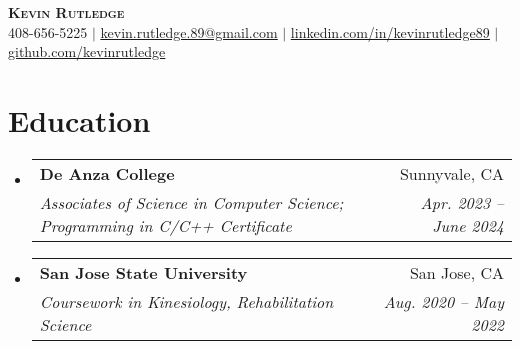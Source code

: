 \documentclass[letterpaper,11pt]{article}
\makeatletter
\newcommand{\resumeSubheading}[4]{
    \vspace{-2pt}\item
    \begin{tabular*}{0.97\textwidth}[t]{l@{\extracolsep{\fill}}r}
        \textbf{#1} & #2 \\
        \textit{\small#3} & \textit{\small #4} \\
    \end{tabular*}\vspace{-7pt}
}
\newenvironment{resumeSubHeadingList}{\begin{itemize}[leftmargin=0.15in, label={}]}{\end{itemize}}
\makeatother
\begin{document}
    \begin{center}
        \textbf{\Huge \scshape Kevin Rutledge} \\ \vspace{3pt}
        \small 408-656-5225 $|$ \href{mailto:kevin.rutledge.89@gmail.com}{\underline{kevin.rutledge.89@gmail.com}} $|$
        \href{https://linkedin.com/in/kevinrutledge89}{\underline{linkedin.com/in/kevinrutledge89}} $|$
        \href{https://github.com/kevinrutledge}{\underline{github.com/kevinrutledge}}
    \end{center}

    \section{Education}
    \label{sec:education}
    \begin{resumeSubHeadingList}
        \resumeSubheading
        {De Anza College}{Sunnyvale, CA}
        {Associates of Science in Computer Science; Programming in C/C++ Certificate}{Apr. 2023 -- June 2024}
        \vspace{2pt}

        \resumeSubheading
        {San Jose State University}{San Jose, CA}
        {Coursework in Kinesiology, Rehabilitation Science}{Aug. 2020 -- May 2022}
    \end{resumeSubHeadingList}

\end{document}
